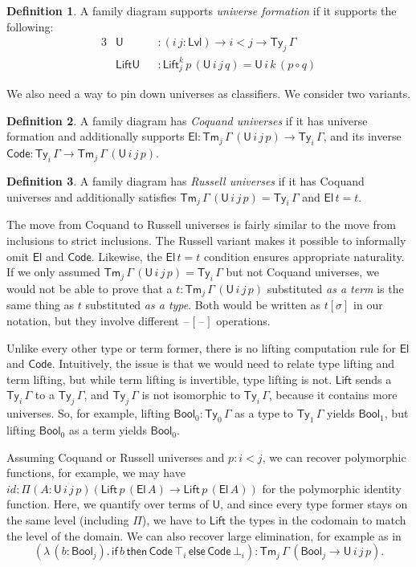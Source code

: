 \documentclass[a4paper,UKenglish,cleveref, autoref, thm-restate]{lipics-v2021}
\theoremstyle{remark}
\theoremstyle{definition}
\newtheorem{mydefinition}{Definition}
\newcommand{\Ty}{\mathsf{Ty}}
\newcommand{\Tm}{\mathsf{Tm}}
\newcommand{\U}{\mathsf{U}}
\newcommand{\El}{\mathsf{El}}
\newcommand{\blank}{\mathord{\hspace{1pt}\text{--}\hspace{1pt}}}
\newcommand{\mi}[1]{\mathit{#1}}
\newcommand{\Bool}{\mathsf{Bool}}
\newcommand{\Lift}{\mathsf{Lift}}
\newcommand{\Lvl}{\mathsf{Lvl}}
\renewcommand{\U}{\mathsf{U}}
\newcommand{\Code}{\mathsf{Code}}
\begin{document}
\begin{mydefinition} A family diagram supports \emph{universe formation} if it supports the following:
\begin{alignat*}{3}
  & \U             &&: (i\,j : \Lvl) \to i < j \to \Ty_j\,\Gamma\\
  & \mathsf{LiftU} &&: \Lift_{j}^{k}\,p\,(\U\,i\,j\,q) = \U\,i\,k\,(p \circ q)
\end{alignat*}
\end{mydefinition}
We also need a way to pin down universes as classifiers. We consider two variants.
\begin{mydefinition}
A family diagram has \emph{Coquand universes} \cite{coquandnorm} if it has universe formation and
additionally supports $\El : \Tm_j\,\Gamma\,(\U\,i\,j\,p) \to \Ty_i\,\Gamma$, and
its inverse $\Code : \Ty_i\,\Gamma \to \Tm_j\,\Gamma\,(\U\,i\,j\,p)$.
\end{mydefinition}
\begin{mydefinition}
A family diagram has \emph{Russell universes} if it has Coquand universes and
additionally satisfies $\Tm_j\,\Gamma\,(\U\,i\,j\,p) = \Ty_i\,\Gamma$ and
$\El\,t = t$.
\end{mydefinition}

The move from Coquand to Russell universes is fairly similar to the move from
inclusions to strict inclusions. The Russell variant makes it possible to
informally omit $\El$ and $\Code$. Likewise, the $\El\,t = t$ condition ensures
appropriate naturality. If we only assumed $\Tm_j\,\Gamma\,(\U\,i\,j\,p) =
\Ty_i\,\Gamma$ but not Coquand universes, we would not be able to prove that a
$t : \Tm_j\,\Gamma\,(\U\,i\,j\,p)$ substituted \emph{as a term} is the same
thing as $t$ substituted \emph{as a type}. Both would be written as $t[\sigma]$
in our notation, but they involve different $\blank[\blank]$ operations.

Unlike every other type or term former, there is no lifting computation rule for
$\El$ and $\Code$. Intuitively, the issue is that we would need to relate type
lifting and term lifting, but while term lifting is invertible, type lifting is
not. $\Lift$ sends a $\Ty_i\,\Gamma$ to a $\Ty_j\,\Gamma$, and $\Ty_j\,\Gamma$
is not isomorphic to $\Ty_i\,\Gamma$, because it contains more universes. So,
for example, lifting $\Bool_0 : \Ty_0\,\Gamma$ as a type to $\Ty_1\,\Gamma$
yields $\Bool_1$, but lifting $\Bool_0$ as a term yields $\Bool_0$.

Assuming Coquand or Russell universes and $p : i < j$, we can recover
polymorphic functions, for example, we may have $\mi{id} : \Pi(A : \U\,i\,j\,p)
(\Lift\,p\,(\El\,A) \to \Lift\,p\,(\El\,A))$ for the polymorphic identity
function. Here, we quantify over terms of $\U$, and since every type former
stays on the same level (including $\Pi$), we have to $\Lift$ the types in the
codomain to match the level of the domain. We can also recover large
elimination, for example as in
\[
(\lambda\,(b : \Bool_j).\,\mathsf{if}\,b\,\mathsf{then}\,\Code\,\top_i\,\mathsf{else}\,\Code\,\bot_i)
: \Tm_j\,\Gamma\,(\Bool_j \to \U\,i\,j\,p).
\]
\end{document}
